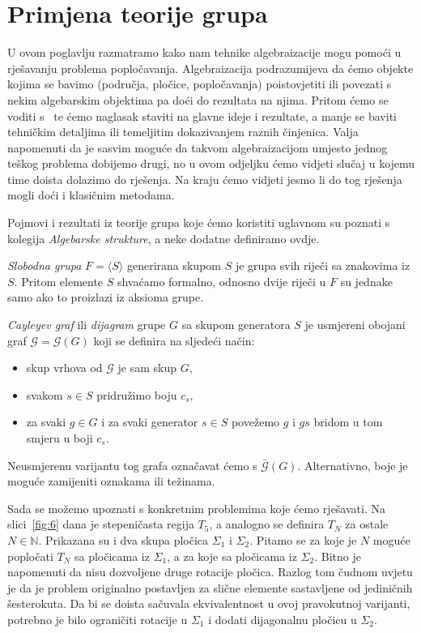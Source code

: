 \documentclass[11pt]{scrartcl}
\begin{document}
\section{Primjena teorije grupa}
U ovom poglavlju razmatramo kako nam tehnike algebraizacije mogu pomoći u rješavanju problema popločavanja. Algebraizacija podrazumijeva da ćemo objekte kojima se bavimo (područja, pločice, popločavanja) poistovjetiti ili povezati s nekim algebarskim objektima pa doći do rezultata na njima. Pritom ćemo se voditi s~\cite{conway} te ćemo naglasak staviti na glavne ideje i rezultate, a manje se baviti tehničkim detaljima ili temeljitim dokazivanjem raznih činjenica. Valja napomenuti da je sasvim moguće da takvom algebraizacijom umjesto jednog teškog problema dobijemo drugi, no u ovom odjeljku ćemo vidjeti slučaj u kojemu time doista dolazimo do rješenja. Na kraju ćemo vidjeti jesmo li do tog rješenja mogli doći i klasičnim metodama.

Pojmovi i rezultati iz teorije grupa koje ćemo koristiti uglavnom su poznati s kolegija \emph{Algebarske strukture}, a neke dodatne definiramo ovdje.
\begin{definicija}
\emph{Slobodna grupa} $F = \langle S \rangle$ generirana skupom $S$ je grupa svih riječi sa znakovima iz $S$. Pritom elemente $S$ shvaćamo formalno, odnosno dvije riječi u $F$ su jednake samo ako to proizlazi iz aksioma grupe.
\end{definicija}
\begin{definicija}
\emph{Cayleyev graf} ili \emph{dijagram} grupe $G$ sa skupom generatora $S$ je usmjereni obojani graf $\mathcal{G} = \mathcal{G}(G)$ koji se definira na sljedeći način: 
\begin{itemize}
\item skup vrhova od $\mathcal{G}$ je sam skup $G$,
\item svakom $s \in S$ pridružimo boju $c_s$, 
\item za svaki $g \in G$ i za svaki generator $s \in S$ povežemo $g$ i $gs$ bridom u tom smjeru u boji $c_s$.
\end{itemize}
Neusmjerenu varijantu tog grafa označavat ćemo s $\bar{\mathcal{G}}(G)$. Alternativno, boje je moguće zamijeniti oznakama ili težinama.
\end{definicija}

Sada se možemo upoznati s konkretnim problemima koje ćemo rješavati. Na slici~\ref{fig:6} dana je stepeničasta regija $T_5$, a analogno se definira $T_N$ za ostale $N \in \mathbb{N}$. Prikazana su i dva skupa pločica $\Sigma_1$ i $\Sigma_2$. Pitamo se za koje je $N$ moguće popločati $T_N$ sa pločicama iz $\Sigma_1$, a za koje sa pločicama iz $\Sigma_2$. Bitno je napomenuti da nisu dozvoljene druge rotacije pločica. Razlog tom čudnom uvjetu je da je problem originalno postavljen za slične elemente sastavljene od jediničnih šesterokuta. Da bi se doista sačuvala ekvivalentnost u ovoj pravokutnoj varijanti, potrebno je bilo ograničiti rotacije u $\Sigma_1$ i dodati dijagonalnu pločicu u $\Sigma_2$.
\end{document}
